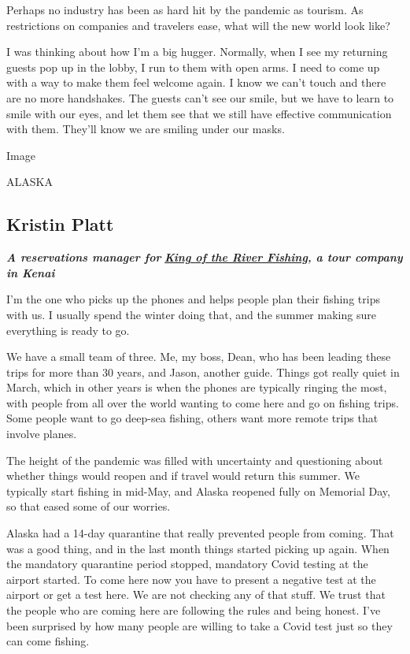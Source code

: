 Perhaps no industry has been as hard hit by the pandemic as tourism. As
restrictions on companies and travelers ease, what will the new world
look like?

I was thinking about how I'm a big hugger. Normally, when I see my
returning guests pop up in the lobby, I run to them with open arms. I
need to come up with a way to make them feel welcome again. I know we
can't touch and there are no more handshakes. The guests can't see our
smile, but we have to learn to smile with our eyes, and let them see
that we still have effective communication with them. They'll know we
are smiling under our masks.

Image

ALASKA

\hypertarget{kristin-platt}{%
\subsection{Kristin Platt}\label{kristin-platt}}

\emph{\textbf{A reservations manager for}}
\textbf{\href{https://www.kingoftheriver.com/}{\emph{King of the River
Fishing}}\emph{, a tour company in Kenai}}

I'm the one who picks up the phones and helps people plan their fishing
trips with us. I usually spend the winter doing that, and the summer
making sure everything is ready to go.

We have a small team of three. Me, my boss, Dean, who has been leading
these trips for more than 30 years, and Jason, another guide. Things got
really quiet in March, which in other years is when the phones are
typically ringing the most, with people from all over the world wanting
to come here and go on fishing trips. Some people want to go deep-sea
fishing, others want more remote trips that involve planes.

The height of the pandemic was filled with uncertainty and questioning
about whether things would reopen and if travel would return this
summer. We typically start fishing in mid-May, and Alaska reopened fully
on Memorial Day, so that eased some of our worries.

Alaska had a 14-day quarantine that really prevented people from coming.
That was a good thing, and in the last month things started picking up
again. When the mandatory quarantine period stopped, mandatory Covid
testing at the airport started. To come here now you have to present a
negative test at the airport or get a test here. We are not checking any
of that stuff. We trust that the people who are coming here are
following the rules and being honest. I've been surprised by how many
people are willing to take a Covid test just so they can come fishing.

